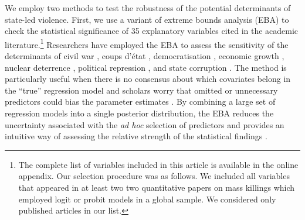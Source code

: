 We employ two methods to test the robustness of the potential determinants of state-led violence. First, we use a variant of extreme bounds analysis (EBA) to check the statistical significance of 35 explanatory variables cited in the academic literature.\footnote{The complete list of variables included in this article is available in the online appendix. Our selection procedure was as follows. We included all variables that appeared in at least two two quantitative papers on mass killings which employed logit or probit models in a global sample. We considered only published articles in our list.} Researchers have employed the EBA to assess the sensitivity of the determinants of civil war \citep{hegre2006sensitivity}, coups d'état \citep{gassebner2016expect}, democratisation \citep{gassebner2013extreme}, economic growth \citep{levine1992sensitivity, sala1997just, sturm2005determinants}, nuclear deterrence \citep{bell2015examining}, political repression \citep{hafner2005right}, and state corruption \citep{serra2006empirical}. The method is particularly useful when there is no consensus about which covariates belong in the ``true'' regression model \citep[178]{sala1997just} and scholars worry that omitted or unnecessary predictors could bias the parameter estimates \citep[60]{angrist2008mostly, clarke2005phantom, elwert2014endogenous, spector2011methodological}. By combining a large set of regression models into a single posterior distribution, the EBA reduces the uncertainty associated with the \textit{ad hoc} selection of predictors and provides an intuitive way of assessing the relative strength of the statistical findings \citep{leamer1985sensitivity, sala1997just}.

